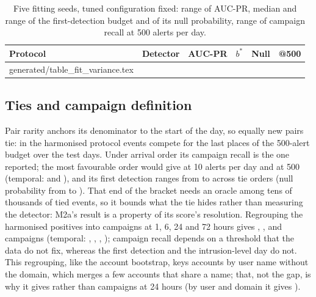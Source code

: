 \documentclass[11pt,a4paper]{article}
\makeatletter
\newcommand{\tablerows}[1]{\@@input #1 }
\makeatother
\begin{document}
\begin{table}[t]
\centering
\scriptsize
\begin{threeparttable}
\caption{Five fitting seeds, tuned configuration fixed: range of AUC-PR, median and range of the first-detection budget and of its null probability, range of campaign recall at 500 alerts per day.}
\label{tab:fit-variance}
\setlength{\tabcolsep}{3pt}
\begin{tabular}{@{}lllllr@{}}
\toprule
Protocol & Detector & AUC-PR & $b^{*}$ & Null & @500 \\
\midrule
\tablerows{generated/table_fit_variance.tex}
\bottomrule
\end{tabular}
\end{threeparttable}
\end{table}

\subsection{Ties and campaign definition}
\label{sec:ties-results}
Pair rarity anchors its denominator to the start of the day, so equally new pairs tie: in the harmonised protocol \HarmPairRarityContenders{} events compete for the last places of the 500-alert budget over the test days. Under arrival order its campaign recall is the one reported; the most favourable order would give \HarmPairRarityBracketTen{} at 10 alerts per day and \HarmPairRarityBracketFiveHundred{} at 500 (temporal: \TempPairRarityBracketTen{} and \TempPairRarityBracketFiveHundred{}), and its first detection ranges from \HarmPairRarityTieBest{} to \HarmPairRarityTieWorst{} across tie orders (null probability from \HarmPairRarityTieBestNull{} to \HarmPairRarityTieWorstNull{}). That end of the bracket needs an oracle among tens of thousands of tied events, so it bounds what the tie hides rather than measuring the detector: M2a's result is a property of its score's resolution. Regrouping the harmonised positives into campaigns at 1, 6, 24 and 72 hours gives \HarmGapCampaignsOne{}, \HarmGapCampaignsSix{}, \HarmGapCampaignsTwentyFour{} and \HarmGapCampaignsSeventyTwo{} campaigns (temporal: \TempGapCampaignsOne{}, \TempGapCampaignsSix{}, \TempGapCampaignsTwentyFour{}, \TempGapCampaignsSeventyTwo{}); campaign recall depends on a threshold that the data do not fix, whereas the first detection and the intrusion-level day do not. This regrouping, like the account bootstrap, keys accounts by user name without the domain, which merges a few accounts that share a name; that, not the gap, is why it gives \HarmGapCampaignsTwentyFour{} rather than \HarmTestCampaigns{} campaigns at 24 hours (by user and domain it gives \HarmRegroupByAccount{}).
\end{document}
